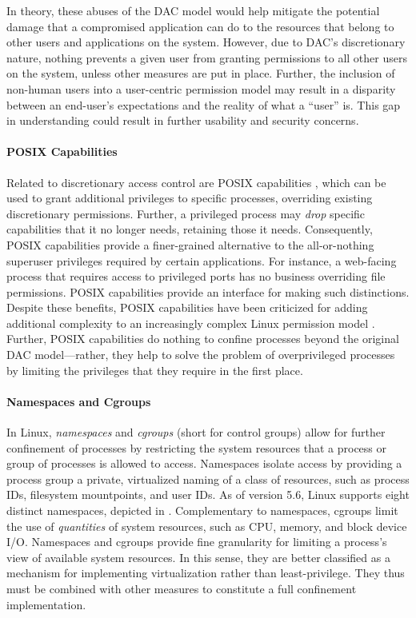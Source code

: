In theory, these abuses of the DAC model would help mitigate the potential damage that a compromised application can do to the resources that belong to other users and applications on the system. However, due to DAC's discretionary nature, nothing prevents a given user from granting permissions to all other users on the system, unless other measures are put in place. Further, the inclusion of non-human users into a user-centric permission model may result in a disparity between an end-user's expectations and the reality of what a \enquote{user} is. This gap in understanding could result in further usability and security concerns.

\paragraph*{POSIX Capabilities}

Related to discretionary access control are POSIX capabilities \cite{posix_capabilities,corbet2006_capabities_a,corbet2006_capabities_b}, which can be used to grant additional privileges to specific processes, overriding existing discretionary permissions. Further, a privileged process may \textit{drop} specific capabilities that it no longer needs, retaining those it needs. Consequently, POSIX capabilities provide a finer-grained alternative to the all-or-nothing superuser privileges required by certain applications. For instance, a web-facing process that requires access to privileged ports has no business overriding file permissions. POSIX capabilities provide an interface for making such distinctions. Despite these benefits, POSIX capabilities have been criticized for adding additional complexity to an increasingly complex Linux permission model \cite{corbet2006_capabities_b,corbet2006_capabities_a}.  Further, POSIX capabilities do nothing to confine processes beyond the original DAC model---rather, they help to solve the problem of overprivileged processes by limiting the privileges that they require in the first place.

\paragraph*{Namespaces and Cgroups}

In Linux, \textit{namespaces} and \textit{cgroups} (short for control groups) allow for further confinement of processes by restricting the system resources that a process or group of processes is allowed to access. Namespaces isolate access by providing a process group a private, virtualized naming of a class of resources, such as process IDs, filesystem mountpoints, and user IDs. As of version 5.6, Linux supports eight distinct namespaces, depicted in .  Complementary to namespaces, cgroups limit the use of \textit{quantities} of system resources, such as CPU, memory, and block device I/O.  Namespaces and cgroups provide fine granularity for limiting a process's view of available system resources. In this sense, they are better classified as a mechanism for implementing virtualization rather than least-privilege. They thus must be combined with other measures to constitute a full confinement implementation.

